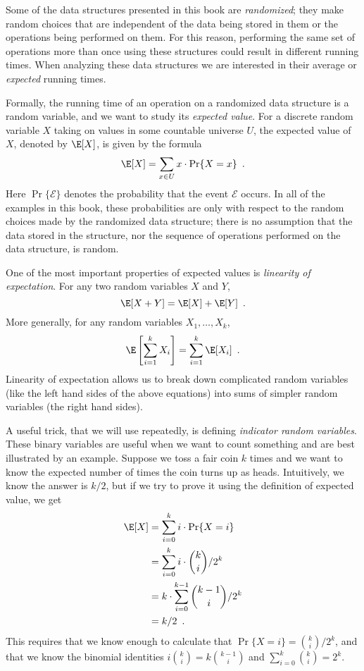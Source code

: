 Some of the data structures presented in this book are \emph{randomized}; they make random choices that are independent of the data being stored in them or the operations being performed on them.  For this reason, performing the same set of operations more than once using these structures could result in different running times.  When analyzing these data structures we are interested in their average or \emph{expected} running times.

Formally, the running time of an operation on a randomized data structure is a random variable, and we want to study its \emph{expected value}.   For a discrete random variable $X$ taking on values in some countable universe $U$, the expected value of $X$, denoted by $\E[X]$, is given by the formula
\[
    \E[X] = \sum_{x\in U} x\cdot\Pr\{X=x\} \enspace .
\]
Here $\Pr\{\mathcal{E}\}$ denotes the probability that the event $\mathcal{E}$ occurs.  In all of the examples in this book, these probabilities are only with respect to the random choices made by the randomized data structure;  there is no assumption that the data stored in the structure, nor the sequence of operations performed on the data structure, is random.

One of the most important properties of expected values is \emph{linearity of expectation}.   For any two random variables $X$ and $Y$,
\[
   \E[X+Y] = \E[X] + \E[Y] \enspace .
\]
More generally, for any random variables $X_1,\ldots,X_k$,
\[
   \E\left[\sum_{i=1}^k X_i\right] = \sum_{i=1}^k \E[X_i] \enspace .
\]
Linearity of expectation allows us to break down complicated random variables (like the left hand sides of the above equations) into sums of simpler random variables (the right hand sides).

A useful trick, that we will use repeatedly, is defining \emph{indicator random variables}.   These binary variables are useful when we want to count something and are best illustrated by an example.  Suppose we toss a fair coin $k$ times and we want to know the expected number of times the coin turns up as heads.   Intuitively, we know the answer is $k/2$, but if we try to prove it using the definition of expected value, we get
\begin{align*}
   \E[X] & = \sum_{i=0}^k i\cdot\Pr\{X=i\} \\
         & = \sum_{i=0}^k i\cdot\binom{k}{i}/2^k \\
         & = k\cdot \sum_{i=0}^{k-1}\binom{k-1}{i}/2^k \\
         & = k/2 \enspace .
\end{align*}
This requires that we know enough to calculate that $\Pr\{X=i\} = \binom{k}{i}/2^k$, and that we know the binomial identities $i\binom{k}{i}=k\binom{k-1}{i}$ and $\sum_{i=0}^{k} \binom{k}{i} = 2^{k}$.

